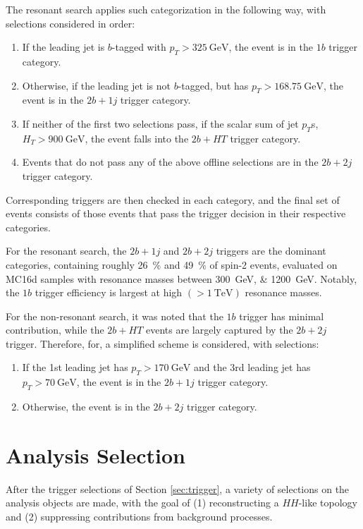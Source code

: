 The resonant search applies such categorization in the following way, with 
selections considered in order:
\begin{enumerate}
	\item If the leading jet is $b$-tagged with $p_{T} > \SI{325}{\GeV}$, the event is in the $1b$ trigger category.
	\item Otherwise, if the leading jet is not $b$-tagged, but has $p_{T} > \SI{168.75}{\GeV}$, the event is in the $2b+1j$
	trigger category.
	\item If neither of the first two selections pass, if the scalar sum of jet $p_{T}$s, $H_{T} > \SI{900}{\GeV}$,
	the event falls into the $2b+HT$ trigger category.
	\item Events that do not pass any of the above offline selections are in the $2b+2j$ trigger category.
\end{enumerate}
Corresponding triggers are then checked in each category, and the final set of events consists of those events that 
pass the trigger decision in their respective categories. 

For the resonant search, the $2b+1j$ and $2b+2j$ triggers are the dominant categories, containing roughly 26~\% and
49~\% of spin-2 events, evaluated on MC16d samples with resonance masses between \SIlist{300;1200}{\GeV}. Notably, 
the $1b$ trigger efficiency is largest at high $(>\SI{1}{\TeV})$ resonance masses.

For the non-resonant search, it was noted that the $1b$ trigger has minimal contribution, while the $2b+HT$ events are 
largely captured by the $2b+2j$ trigger. Therefore, for, a simplified scheme is considered, 
with selections:
\begin{enumerate}
	\item If the 1st leading jet has $p_{T} > \SI{170}{\GeV}$ and the 3rd leading jet has $p_{T} > \SI{70}{\GeV}$,
	the event is in the $2b+1j$ trigger category.
	\item Otherwise, the event is in the $2b+2j$ trigger category.
\end{enumerate}


\section{Analysis Selection}
\label{sec:analysis-selection}
After the trigger selections of Section \ref{sec:trigger}, a variety of selections on the analysis objects
are made, with the goal of (1) reconstructing a $HH$-like topology and (2) suppressing contributions from 
background processes. 

